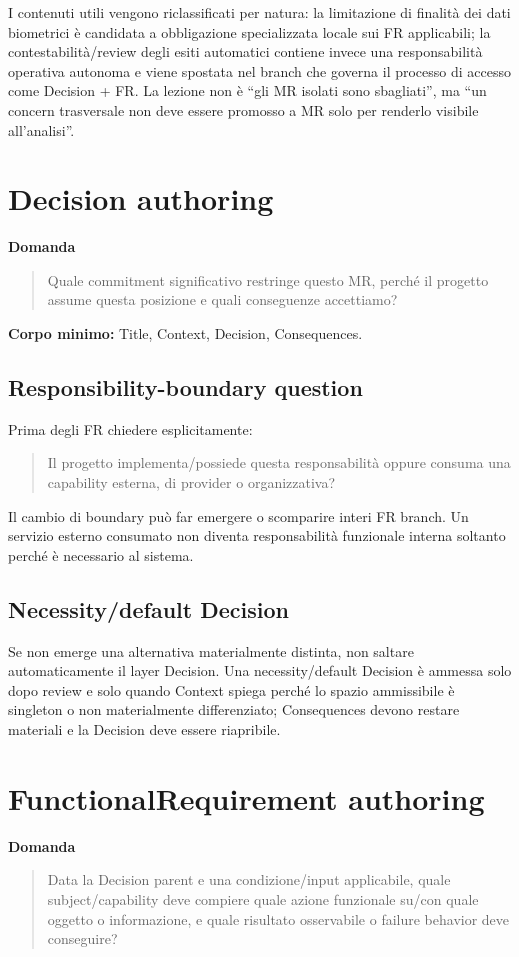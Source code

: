 \documentclass[11pt,a4paper]{article}
\begin{document}
I contenuti utili vengono riclassificati per natura: la limitazione di finalità dei dati biometrici è candidata a obbligazione specializzata locale sui FR applicabili; la contestabilità/review degli esiti automatici contiene invece una responsabilità operativa autonoma e viene spostata nel branch che governa il processo di accesso come Decision + FR. La lezione non è ``gli MR isolati sono sbagliati'', ma ``un concern trasversale non deve essere promosso a MR solo per renderlo visibile all'analisi''.

\section{Decision authoring}
\textbf{Domanda}
\begin{quote}
Quale commitment significativo restringe questo MR, perché il progetto assume questa posizione e quali conseguenze accettiamo?
\end{quote}
\textbf{Corpo minimo:} Title, Context, Decision, Consequences.

\subsection{Responsibility-boundary question}
Prima degli FR chiedere esplicitamente:
\begin{quote}
Il progetto implementa/possiede questa responsabilità oppure consuma una capability esterna, di provider o organizzativa?
\end{quote}
Il cambio di boundary può far emergere o scomparire interi FR branch. Un servizio esterno consumato non diventa responsabilità funzionale interna soltanto perché è necessario al sistema.

\subsection{Necessity/default Decision}
Se non emerge una alternativa materialmente distinta, non saltare automaticamente il layer Decision. Una necessity/default Decision è ammessa solo dopo review e solo quando Context spiega perché lo spazio ammissibile è singleton o non materialmente differenziato; Consequences devono restare materiali e la Decision deve essere riapribile.

\section{FunctionalRequirement authoring}
\textbf{Domanda}
\begin{quote}
Data la Decision parent e una condizione/input applicabile, quale subject/capability deve compiere quale azione funzionale su/con quale oggetto o informazione, e quale risultato osservabile o failure behavior deve conseguire?
\end{quote}
\end{document}
